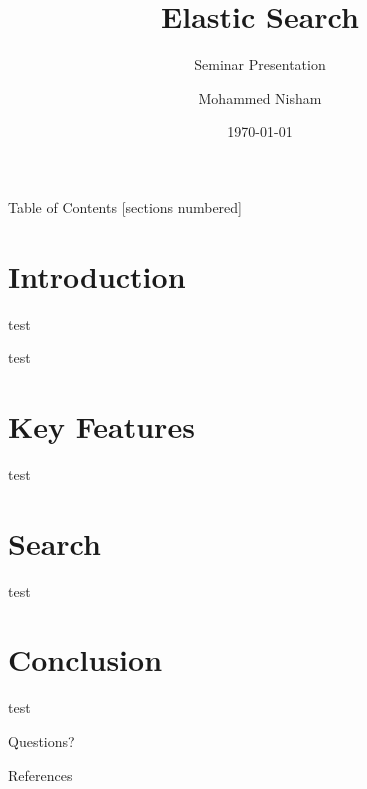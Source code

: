 \documentclass[10pt]{beamer}
\title{Elastic Search}
\subtitle{Seminar Presentation}
\date{\today}
\author{Mohammed Nisham}
\institute{College of Engineering, Trivandrum}
\begin{document}
\nocite{*}
\maketitle

\begin{frame}{Table of Contents}
  [sections numbered]
  \tableofcontents[hideallsubsections]
\end{frame}

\section{Introduction}
\begin{frame}{test}
\end{frame}

\begin{frame}{test}
\end{frame}

\section{Key Features}
\begin{frame}{test}
\end{frame}

\section{Search}
\begin{frame}{test}
\end{frame}

\section{Conclusion}
\begin{frame}{test}
\end{frame}

\begin{frame}[standout]
  Questions?
\end{frame}

\begin{frame}[allowframebreaks]{References}

  
  

\end{frame}
\end{document}
